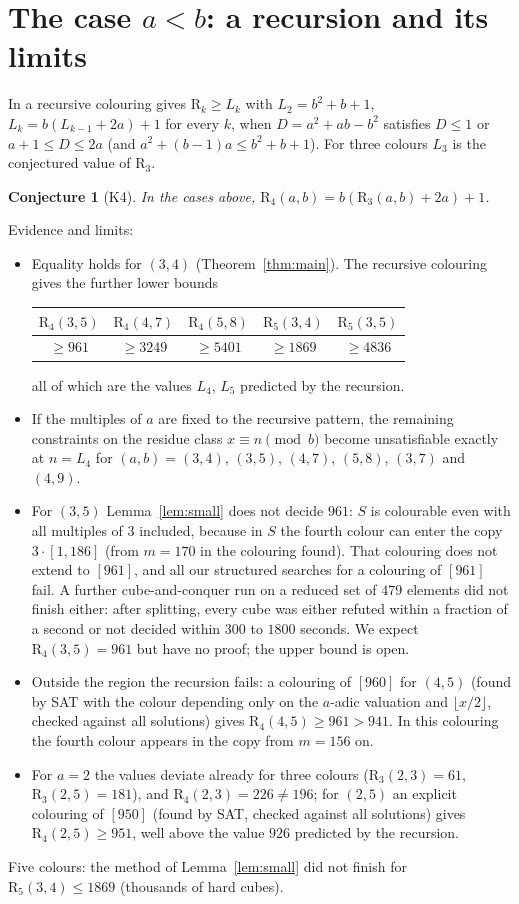 \documentclass[11pt,a4paper]{article}
\newtheorem{conjecture}[theorem]{Conjecture}
\theoremstyle{definition}
\theoremstyle{remark}
\newcommand{\R}{\mathrm{R}}
\begin{document}
\clearpage
\section{The case \texorpdfstring{$a<b$}{a<b}: a recursion and its limits}
In \cite{Ich26b} a recursive colouring gives $\R_k\ge L_k$ with $L_2=b^2+b+1$, $L_k=b(L_{k-1}+2a)+1$ for every $k$, when $D=a^2+ab-b^2$ satisfies $D\le1$ or $a+1\le D\le 2a$ (and $a^2+(b-1)a\le b^2+b+1$). For three colours $L_3$ is the conjectured value of $\R_3$.
\begin{conjecture}[K4]
In the cases above, $\R_4(a,b)=b(\R_3(a,b)+2a)+1$.
\end{conjecture}
Evidence and limits:
\begin{itemize}
\item Equality holds for $(3,4)$ (Theorem~\ref{thm:main}). The recursive colouring gives the further lower bounds
\begin{center}
\begin{tabular}{ccccc}
\toprule
$\R_4(3,5)$ & $\R_4(4,7)$ & $\R_4(5,8)$ & $\R_5(3,4)$ & $\R_5(3,5)$\\
\midrule
$\ge961$ & $\ge3249$ & $\ge5401$ & $\ge1869$ & $\ge4836$\\
\bottomrule
\end{tabular}
\end{center}
all of which are the values $L_4$, $L_5$ predicted by the recursion.
\item If the multiples of $a$ are fixed to the recursive pattern, the remaining constraints on the residue class $x\equiv n\pmod b$ become unsatisfiable exactly at $n=L_4$ for $(a,b)=(3,4)$, $(3,5)$, $(4,7)$, $(5,8)$, $(3,7)$ and $(4,9)$.
\item For $(3,5)$ Lemma~\ref{lem:small} does not decide $961$: $S$ is colourable even with all multiples of $3$ included, because in $S$ the fourth colour can enter the copy $3\cdot[1,186]$ (from $m=170$ in the colouring found). That colouring does not extend to $[961]$, and all our structured searches for a colouring of $[961]$ fail. A further cube-and-conquer run on a reduced set of $479$ elements did not finish either: after splitting, every cube was either refuted within a fraction of a second or not decided within $300$ to $1800$ seconds. We expect $\R_4(3,5)=961$ but have no proof; the upper bound is open.
\item Outside the region the recursion fails: a colouring of $[960]$ for $(4,5)$ (found by SAT with the colour depending only on the $a$-adic valuation and $\lfloor x/2\rfloor$, checked against all solutions) gives $\R_4(4,5)\ge961>941$. In this colouring the fourth colour appears in the copy from $m=156$ on.
\item For $a=2$ the values deviate already for three colours ($\R_3(2,3)=61$, $\R_3(2,5)=181$), and $\R_4(2,3)=226\ne196$; for $(2,5)$ an explicit colouring of $[950]$ (found by SAT, checked against all solutions) gives $\R_4(2,5)\ge951$, well above the value $926$ predicted by the recursion.
\end{itemize}
Five colours: the method of Lemma~\ref{lem:small} did not finish for $\R_5(3,4)\le1869$ (thousands of hard cubes).
\end{document}
